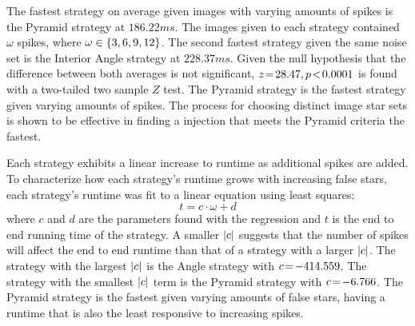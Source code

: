 %
%
%
%
The fastest strategy on average given images with varying amounts of spikes is the Pyramid strategy at $186.22\si{ms}$.
The images given to each strategy contained $\omega$ spikes, where $\omega \in \left\{  3, 6, 9, 12  \right\}$.
The second fastest strategy given the same noise set is the Interior Angle strategy at $228.37\si{ms}$.
Given the null hypothesis that the difference between both averages is not significant, $z \!=\! 28.47, p\!<\!0.0001$ is
found with a two-tailed two sample $Z$ test.
The Pyramid strategy is the fastest strategy given varying amounts of spikes.
The process for choosing distinct image star sets is shown to be effective in finding a injection that meets the Pyramid
criteria the fastest.

%
%
%
Each strategy exhibits a linear increase to runtime as additional spikes are added.
To characterize how each strategy's runtime grows with increasing false stars, each strategy's runtime was fit
to a linear equation using least squares:
\begin{equation}
    t = c\cdot\omega + d
\end{equation}
where $c$ and $d$ are the parameters found with the regression and $t$ is the end to end running time of the strategy.
A smaller $\left| c \right|$ suggests that the number of spikes will affect the end to end runtime than that of a strategy with a
larger $\left| c \right|$.
The strategy with the largest $\left| c \right|$ is the Angle strategy with $c \!=\! -414.559$.
The strategy with the smallest $\left| c \right|$ term is the Pyramid strategy with $c \!=\! -6.766$.
The Pyramid strategy is the fastest given varying amounts of false stars, having a runtime that is also the least
responsive to increasing spikes.

